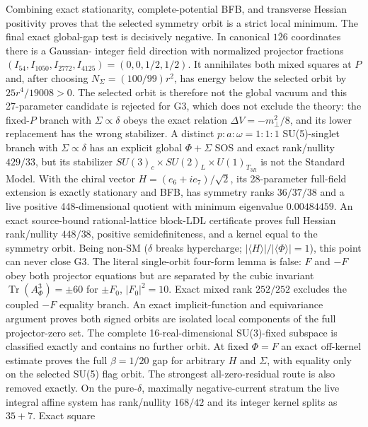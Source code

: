 \documentclass[11pt,a4paper]{article}
\begin{document}
Combining exact stationarity, complete-potential BFB, and transverse Hessian
positivity proves that the selected symmetry orbit is a strict local minimum.
The final exact global-gap test is decisively negative.
In canonical $\overline{126}$ coordinates there is a Gaussian-
integer field direction with normalized projector fractions
$(I_{54},I_{1050},I_{2772},I_{4125})=(0,0,1/2,1/2)$.  It annihilates both mixed
squares at $P$ and, after choosing $N_\Sigma=(100/99)r^2$, has energy below the selected orbit by
$25r^4/19008>0$.  The selected orbit is therefore not the global vacuum and
this 27-parameter candidate is rejected for G3, which does not
exclude the theory: the fixed-$P$ branch with
$\Sigma\propto\delta$ obeys the exact relation $\Delta V=-m_\perp^2/8$, and its
lower replacement has the wrong stabilizer. A distinct $p:a:\omega=1:1:1$
SU(5)-singlet branch with $\Sigma\propto\delta$ has an explicit global
$\Phi+\Sigma$ SOS and exact rank/nullity $429/33$, but its stabilizer
$SU(3)_c\times SU(2)_L\times U(1)_{T_{3R}}$ is not the Standard Model.  With the chiral vector
$H=(e_6+i e_7)/\sqrt2$, its 28-parameter full-field extension is exactly
stationary and BFB, has symmetry ranks $36/37/38$ and a live positive
448-dimensional quotient with minimum eigenvalue $0.00484459$.  An exact
source-bound rational-lattice block-LDL certificate proves full Hessian
rank/nullity $448/38$, positive semidefiniteness, and a kernel equal to the
symmetry orbit.  Being non-SM
($\delta$ breaks hypercharge; $|\langle H\rangle|/|\langle\Phi\rangle|=1$), this
point can never close G3.  The literal
single-orbit four-form lemma is false: $F$ and $-F$ obey both projector
equations but are separated by the cubic invariant
$\operatorname{Tr}(A_\Phi^3)=\pm60$ for $\pm F_0$, $|F_0|^2=10$.  Exact mixed
rank $252/252$ excludes the
coupled $-F$ equality branch.  An exact
implicit-function and equivariance argument proves
both signed orbits are isolated local components of the full projector-zero
set.  The complete 16-real-dimensional SU(3)-fixed subspace is classified
exactly and contains no further orbit.  At fixed $\Phi=F$ an exact
off-kernel estimate proves the full $\beta=1/20$ gap for arbitrary $H$ and
  $\Sigma$, with equality only on the selected SU(5) flag orbit.  The strongest
  all-zero-residual route is also removed exactly.  On the pure-$\delta$,
  maximally negative-current stratum the live integral affine system has
  rank/nullity $168/42$ and its integer kernel splits as $35+7$.  Exact square
\end{document}
